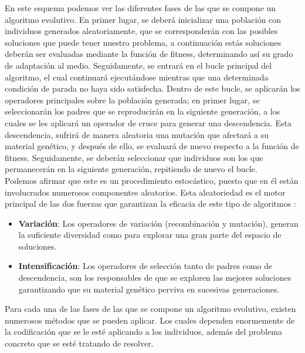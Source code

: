En este esquema podemos ver las diferentes fases de las que se compone un algoritmo evolutivo. En primer lugar, se deberá inicializar una población con individuos generados aleatoriamente, que se corresponderán con las posibles soluciones que puede tener nuestro problema, a continuación estás soluciones deberán ser evaluadas mediante la función de fitness, determinando así su grado de adaptación al medio. Seguidamente, se entrará en el bucle principal del algoritmo, el cual continuará ejecutándose mientras que una determinada condición de parada no haya sido satisfecha. Dentro de este bucle, se aplicarán los operadores principales sobre la población generada; en primer lugar, se seleccionarán los padres que se reproducirán en la siguiente generación, a los cuales se les aplicará un operador de cruce para generar una descendencia. Esta descendencia, sufrirá de manera aleatoria una mutación que afectará a su material genético, y después de ello, se evaluará de nuevo respecto a la función de fitness. Seguidamente, se deberán seleccionar que individuos son los que permanecerán en la siguiente generación, repitiendo de nuevo el bucle. \\ 

Podemos afirmar que este es un procedimiento estocástico, puesto que en él están involucrados numerosos componentes aleatorios. Esta aleatoriedad es el motor principal de las dos fuerzas que garantizan la eficacia de este tipo de algoritmos \cite{eiben2003introduction}:

\begin{itemize}
    \item \textbf{Variación}: Los operadores de variación (recombinación y mutación), generan la suficiente diversidad como para explorar una gran parte del espacio de soluciones.
    \item \textbf{Intensificación}: Los operadores de selección tanto de padres como de descendencia, son los responsables de que se exploren las mejores soluciones garantizando que su material genético perviva en sucesivas generaciones.
\end{itemize}

Para cada una de las fases de las que se compone un algoritmo evolutivo, existen numerosos métodos que se pueden aplicar. Los cuales dependen enormemente de la codificación que se le esté aplicando a los individuos, además del problema concreto que se esté tratando de resolver.